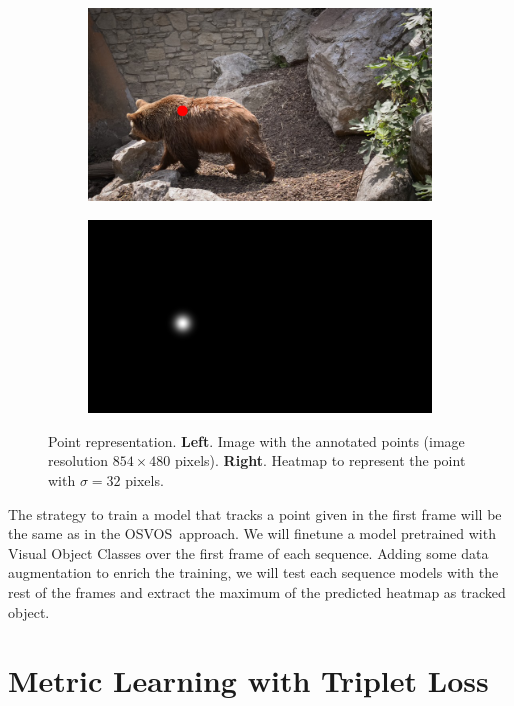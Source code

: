 \begin{figure}[h]
  \centering
  \begin{subfigure}{.5\textwidth}
    \centering
    \includegraphics[width=.8\linewidth]{figures/methods/heatmaps/image_point.png}
  \end{subfigure}%
  \begin{subfigure}{.5\textwidth}
    \centering
    \includegraphics[width=.8\linewidth]{figures/methods/heatmaps/heatmap.png}
  \end{subfigure}
  \caption{
  Point representation.
  \textbf{Left}. Image with the annotated points (image resolution $854 \times 480$ pixels).
  \textbf{Right}. Heatmap to represent the point with $\sigma = 32$ pixels. }
  \label{fig:point_representation}
\end{figure}

The strategy to train a model that tracks a point given in the first frame will be the same as in the OSVOS~\osvos approach.
We will finetune a model pretrained with Visual Object Classes over the first frame of each sequence.
Adding some data augmentation to enrich the training, we will test each sequence models with the rest of the frames and extract the maximum of the predicted heatmap as tracked object.

\section{Metric Learning with Triplet Loss}
\label{sec:methods_metriclearning}

